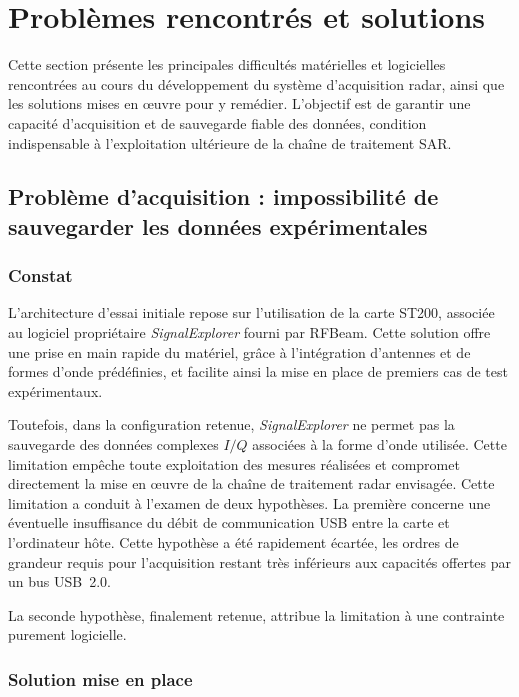 \section{Problèmes rencontrés et solutions}

Cette section présente les principales difficultés matérielles et logicielles rencontrées au cours du développement du système d’acquisition radar, ainsi que les solutions mises en œuvre pour y remédier. L’objectif est de garantir une capacité d’acquisition et de sauvegarde fiable des données, condition indispensable à l’exploitation ultérieure de la chaîne de traitement SAR.

\subsection{Problème d’acquisition : impossibilité de sauvegarder les données expérimentales}

\subsubsection{Constat}

L’architecture d’essai initiale repose sur l’utilisation de la carte ST200, associée au logiciel propriétaire \textit{SignalExplorer} fourni par RFBeam. Cette solution offre une prise en main rapide du matériel, grâce à l’intégration d’antennes et de formes d’onde prédéfinies, et facilite ainsi la mise en place de premiers cas de test expérimentaux.

Toutefois, dans la configuration retenue, \textit{SignalExplorer} ne permet pas la sauvegarde des données complexes $I/Q$ associées à la forme d’onde utilisée. Cette limitation empêche toute exploitation des mesures réalisées et compromet directement la mise en œuvre de la chaîne de traitement radar envisagée.
Cette limitation a conduit à l’examen de deux hypothèses. La première concerne une éventuelle insuffisance du débit de communication USB entre la carte et l’ordinateur hôte. Cette hypothèse a été rapidement écartée, les ordres de grandeur requis pour l’acquisition restant très inférieurs aux capacités offertes par un bus USB~2.0.  

La seconde hypothèse, finalement retenue, attribue la limitation à une contrainte purement logicielle.

\subsubsection{Solution mise en place}

